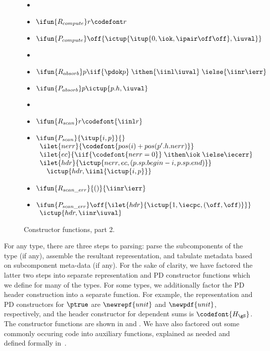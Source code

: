 \begin{figure}
\begin{itemize}
\item %
\item $\ifun{R_{compute}} r {\codefont r}$
\item $\ifun{P_{compute}} \off {\ictup{\itup{0,\iok,\ipair \off \off},\iuval}}$

\item %
\item $\ifun {R_{absorb}} p {\iif {\pdok p}\; 
    \ithen {\iinl \iuval}\; \ielse {\iinr \ierr}}$
\item $\ifun {P_{absorb}} p {\ictup{p.h,\iuval}}$

\item %
\item $\ifun{R_{scan}} r  {\codefont{\iinl r}}$
\item $\ifun{P_{scan}} {\itup{i,p}} {}$ \\
$\begin{array}{l}
\ilet {nerr} {\codefont{pos(i) + pos(p'.h.nerr)}}\\
\ilet {ec} {\iif {\codefont{nerr = 0}}\; \ithen \iok\; \ielse \iecerr} \\
\ilet {hdr} {\ictup{nerr,ec,(p.sp.begin - i,p.sp.end)}} \\
\quad \ictup{hdr,\iinl {\ictup{i,p}}}
\end{array}$

\item $\ifun {R_{scan\_err}} {()} {\iinr \ierr}$
\item $\ifun {P_{scan\_err}} \off {\ilet {hdr} {\ictup{1,\iecpc,(\off,\off)}}}$\\
  \verb+ +$\ictup{hdr,\iinr \iuval}$
\end{itemize}
\caption{Constructor functions, part 2.}
\label{fig:cons-funs-cont}
\end{figure}

For any type, there are three steps to parsing: parse the
subcomponents of the type (if any), assemble the resultant
representation, and tabulate metadata based on subcomponent meta-data
(if any). For the sake of clarity, we have factored the latter two
steps into separate representation and PD constructor functions which
we define for many of the types. For some types, we additionally factor the PD
header construction into a separate function. For example, the
representation and PD constructors for $\ptrue$ are $\newrepf {unit}$
and $\newpdf {unit}$, respectively, and the header constructor for
dependent sums is ${\codefont{H_{\gS}}}$. The constructor functions are shown in
 and . We have also
factored out some commonly occuring code into auxiliary functions,
explained as needed and defined formally in~.


